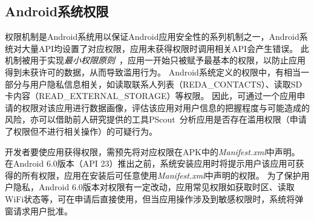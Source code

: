 \subsection{Android系统权限}
\label{sec:permission}

权限机制是Android系统用以保证Android应用安全性的系列机制之一，Android系统对大量API均设置了对应权限，应用未获得权限时调用相关API会产生错误。
此机制被用于实现\textit{最小权限原则}~\cite{android_fundamental}，应用一开始只被赋予最基本的权限，以防止应用得到未获许可的数据，从而导致滥用行为。
Android系统定义的权限中，有相当一部分与用户隐私信息相关，如读取联系人列表（REDA\_CONTACTS）、读取SD卡内容（READ\_EXTERNAL\_STORAGE）等权限。
因此，可通过一个应用申请的权限对该应用进行数据画像，评估该应用对用户信息的把握程度与可能造成的风险，亦可以借助前人研究提供的工具PScout~\cite{au2012pscout}分析应用是否存在滥用权限（申请了权限但不进行相关操作）的可疑行为。

开发者要使应用获得权限，需预先将对应权限在APK中的\textit{Manifest.xml}中声明。
在Android 6.0版本（API 23）推出之前，系统安装应用时将提示用户该应用可获得的所有权限，应用在安装后可任意使用\textit{Manifest.xml}中声明的权限。
为了保护用户隐私，Android 6.0版本对权限有一定改动，应用常见权限如获取时区、读取WiFi状态等，可在申请后直接使用，但当应用操作涉及到敏感权限时，系统将弹窗请求用户批准。


